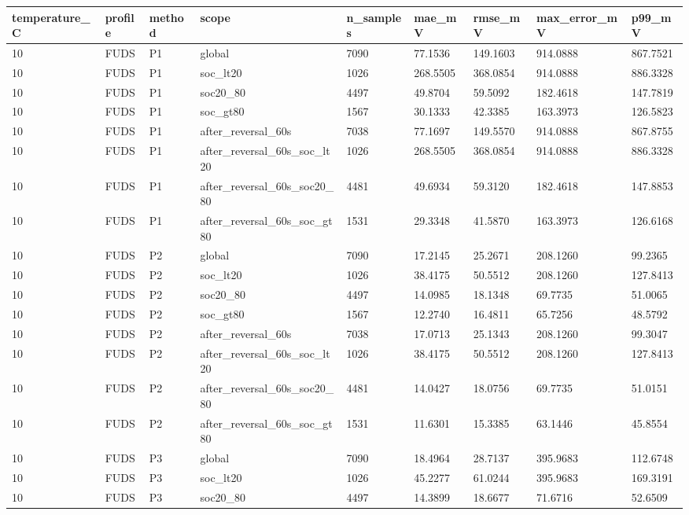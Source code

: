 \begin{tabular}{lllllllll}
\hline
temperature\_C & profile & method & scope & n\_samples & mae\_mV & rmse\_mV & max\_error\_mV & p99\_mV \\
\hline
10 & FUDS & P1 & global & 7090 & 77.1536 & 149.1603 & 914.0888 & 867.7521 \\
10 & FUDS & P1 & soc\_lt20 & 1026 & 268.5505 & 368.0854 & 914.0888 & 886.3328 \\
10 & FUDS & P1 & soc20\_80 & 4497 & 49.8704 & 59.5092 & 182.4618 & 147.7819 \\
10 & FUDS & P1 & soc\_gt80 & 1567 & 30.1333 & 42.3385 & 163.3973 & 126.5823 \\
10 & FUDS & P1 & after\_reversal\_60s & 7038 & 77.1697 & 149.5570 & 914.0888 & 867.8755 \\
10 & FUDS & P1 & after\_reversal\_60s\_soc\_lt20 & 1026 & 268.5505 & 368.0854 & 914.0888 & 886.3328 \\
10 & FUDS & P1 & after\_reversal\_60s\_soc20\_80 & 4481 & 49.6934 & 59.3120 & 182.4618 & 147.8853 \\
10 & FUDS & P1 & after\_reversal\_60s\_soc\_gt80 & 1531 & 29.3348 & 41.5870 & 163.3973 & 126.6168 \\
10 & FUDS & P2 & global & 7090 & 17.2145 & 25.2671 & 208.1260 & 99.2365 \\
10 & FUDS & P2 & soc\_lt20 & 1026 & 38.4175 & 50.5512 & 208.1260 & 127.8413 \\
10 & FUDS & P2 & soc20\_80 & 4497 & 14.0985 & 18.1348 & 69.7735 & 51.0065 \\
10 & FUDS & P2 & soc\_gt80 & 1567 & 12.2740 & 16.4811 & 65.7256 & 48.5792 \\
10 & FUDS & P2 & after\_reversal\_60s & 7038 & 17.0713 & 25.1343 & 208.1260 & 99.3047 \\
10 & FUDS & P2 & after\_reversal\_60s\_soc\_lt20 & 1026 & 38.4175 & 50.5512 & 208.1260 & 127.8413 \\
10 & FUDS & P2 & after\_reversal\_60s\_soc20\_80 & 4481 & 14.0427 & 18.0756 & 69.7735 & 51.0151 \\
10 & FUDS & P2 & after\_reversal\_60s\_soc\_gt80 & 1531 & 11.6301 & 15.3385 & 63.1446 & 45.8554 \\
10 & FUDS & P3 & global & 7090 & 18.4964 & 28.7137 & 395.9683 & 112.6748 \\
10 & FUDS & P3 & soc\_lt20 & 1026 & 45.2277 & 61.0244 & 395.9683 & 169.3191 \\
10 & FUDS & P3 & soc20\_80 & 4497 & 14.3899 & 18.6677 & 71.6716 & 52.6509 \\

\end{tabular}
